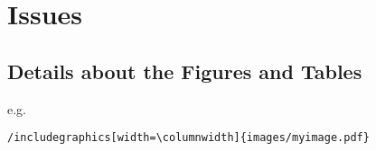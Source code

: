 \section{Issues}

\subsection{Details about the Figures and Tables}

 e.g. \begin{verbatim}/includegraphics[width=\columnwidth]{images/myimage.pdf}\end{verbatim}


